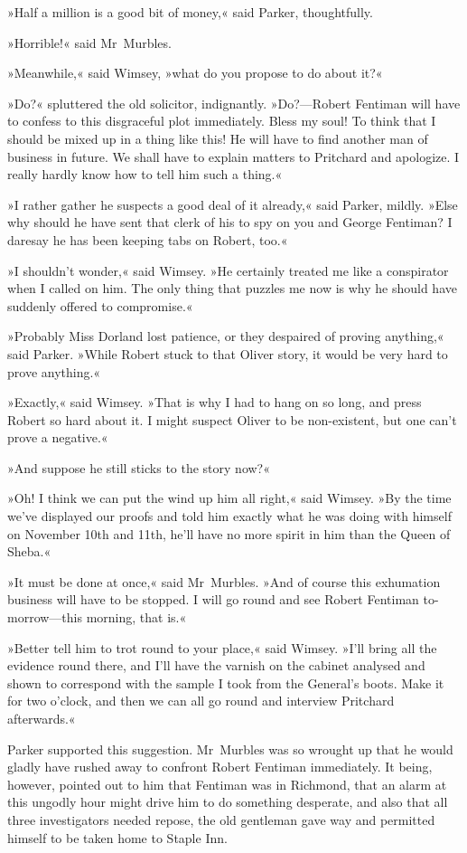 »Half a million is a good bit of money,« said Parker, thoughtfully.

»Horrible!« said Mr~Murbles.

»Meanwhile,« said Wimsey, »what do you propose to do about it?«

»Do?« spluttered the old solicitor, indignantly. »Do?—Robert Fentiman will have to confess to this disgraceful plot immediately. Bless my soul! To think that I should be mixed up in a thing like this! He will have to find another man of business in future. We shall have to explain matters to Pritchard and apologize. I really hardly know how to tell him such a thing.«

»I rather gather he suspects a good deal of it already,« said Parker, mildly. »Else why should he have sent that clerk of his to spy on you and George Fentiman? I daresay he has been keeping tabs on Robert, too.«

»I shouldn't wonder,« said Wimsey. »He certainly treated me like a conspirator when I called on him. The only thing that puzzles me now is why he should have suddenly offered to compromise.«

»Probably Miss Dorland lost patience, or they despaired of proving anything,« said Parker. »While Robert stuck to that Oliver story, it would be very hard to prove anything.«

»Exactly,« said Wimsey. »That is why I had to hang on so long, and press Robert so hard about it. I might suspect Oliver to be non-existent, but one can't prove a negative.«

»And suppose he still sticks to the story now?«

»Oh! I think we can put the wind up him all right,« said Wimsey. »By the time we've displayed our proofs and told him exactly what he was doing with himself on November 10th and 11th, he'll have no more spirit in him than the Queen of Sheba.«

»It must be done at once,« said Mr~Murbles. »And of course this exhumation business will have to be stopped. I will go round and see Robert Fentiman to-morrow—this morning, that is.«

»Better tell him to trot round to your place,« said Wimsey. »I'll bring all the evidence round there, and I'll have the varnish on the cabinet analysed and shown to correspond with the sample I took from the General's boots. Make it for two o'clock, and then we can all go round and interview Pritchard afterwards.«

Parker supported this suggestion. Mr~Murbles was so wrought up that he would gladly have rushed away to confront Robert Fentiman immediately. It being, however, pointed out to him that Fentiman was in Richmond, that an alarm at this ungodly hour might drive him to do something desperate, and also that all three investigators needed repose, the old gentleman gave way and permitted himself to be taken home to Staple Inn.

